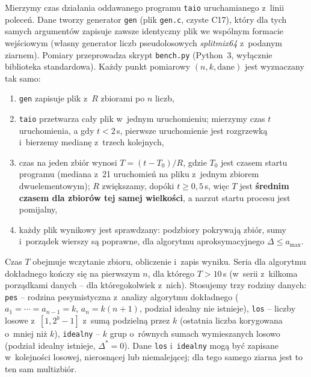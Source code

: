 \documentclass[11pt]{article}
\begin{document}
Mierzymy czas działania oddawanego programu \texttt{taio} uruchamianego z~linii poleceń.
Dane tworzy generator \texttt{gen} (plik \texttt{gen.c}, czyste C17), który dla tych samych
argumentów zapisuje zawsze identyczny plik we wspólnym formacie wejściowym (własny generator
liczb pseudolosowych \emph{splitmix64} z~podanym ziarnem). Pomiary przeprowadza skrypt
\texttt{bench.py} (Python~3, wyłącznie biblioteka standardowa). Każdy punkt pomiarowy
\((n,k,\text{dane})\) jest wyznaczany tak samo:
\begin{enumerate}
    \item \texttt{gen} zapisuje plik z~\(R\) zbiorami po \(n\) liczb,
    \item \texttt{taio} przetwarza cały plik w~jednym uruchomieniu; mierzymy czas \(t\)
          uruchomienia, a gdy \(t<2\)\,s, pierwsze uruchomienie jest rozgrzewką i~bierzemy
          medianę z~trzech kolejnych,
    \item czas na jeden zbiór wynosi \(T=(t-T_0)/R\), gdzie \(T_0\) jest czasem startu
          programu (mediana z~21 uruchomień na pliku z~jednym zbiorem dwuelementowym);
          \(R\) zwiększamy, dopóki \(t\geq 0{,}5\)\,s, więc \(T\) jest \textbf{średnim czasem
          dla zbiorów tej samej wielkości}, a narzut startu procesu jest pomijalny,
    \item każdy plik wynikowy jest sprawdzany: podzbiory pokrywają zbiór, sumy i~porządek
          wierszy są poprawne, dla algorytmu aproksymacyjnego \(\Delta\leq a_{\max}\).
\end{enumerate}
Czas \(T\) obejmuje wczytanie zbioru, obliczenie i~zapis wyniku. Seria dla algorytmu
dokładnego kończy się na pierwszym \(n\), dla którego \(T>10\)\,s (w~serii z~kilkoma
porządkami danych -- dla któregokolwiek z~nich). Stosujemy trzy rodziny
danych: \texttt{pes} -- rodzina pesymistyczna z~analizy algorytmu dokładnego
(\(a_1=\cdots=a_{n-1}=k\), \(a_n=k(n+1)\), podział idealny nie istnieje),
\texttt{los} -- liczby losowe z~\([1,2^b-1]\) z~sumą podzielną przez \(k\) (ostatnia liczba
korygowana o~mniej niż \(k\)), \texttt{idealny} -- \(k\) grup o~równych sumach wymieszanych
losowo (podział idealny istnieje, \(\Delta^*=0\)). Dane \texttt{los} i~\texttt{idealny}
mogą być zapisane w~kolejności losowej, nierosnącej lub niemalejącej; dla tego samego ziarna
jest to ten sam multizbiór.
\end{document}
